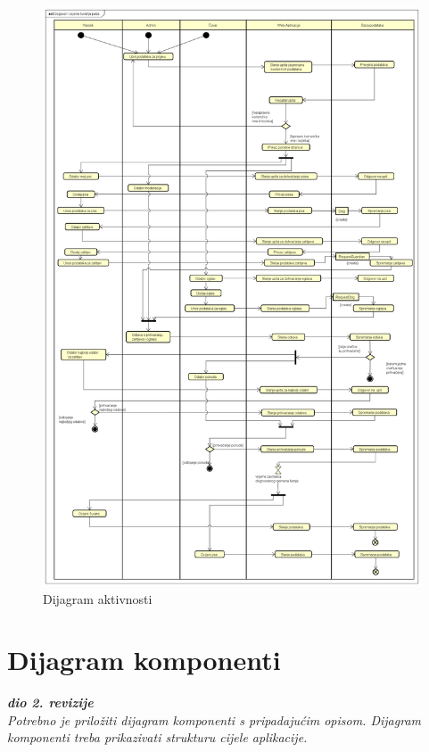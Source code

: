 			\begin{figure}[H]
				\centering
				\includegraphics[width=15cm]{slike/Dijagram aktivnosti}
				\caption{Dijagram aktivnosti}
				\label{fig:Activity-Diagram}
			\end{figure}
			
			 
			
			\eject
		\section{Dijagram komponenti}
		
			\textbf{\textit{dio 2. revizije}}\\
		
			 \textit{Potrebno je priložiti dijagram komponenti s pripadajućim opisom. Dijagram komponenti treba prikazivati strukturu cijele aplikacije.}